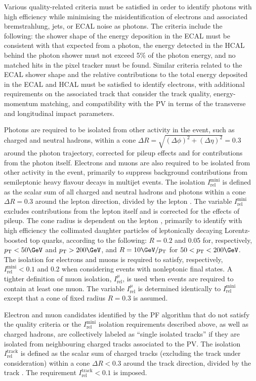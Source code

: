Various quality-related criteria must be satisfied in order to
identify photons with high efficiency while minimising the
misidentification of electrons and associated bremstrahlung, jets,
or ECAL noise as photons. The criteria include the following: the
shower shape of the energy deposition in the ECAL must be consistent
with that expected from a photon, the energy detected in the HCAL
behind the photon shower must not exceed 5\% of the photon energy, and
no matched hits in the pixel tracker must be found. Similar criteria
related to the ECAL shower shape and the relative contributions to the
total energy deposited in the ECAL and HCAL must be satisfied to
identify electrons, with additional requirements on the associated
track that consider the track quality, energy-momentum matching, and
compatibility with the PV in terms of the transverse and longitudinal
impact parameters.

Photons are required to be isolated from other activity in the event,
such as charged and neutral hadrons, within a cone $\Delta R =
\sqrt{(\Delta\phi)^2 + (\Delta\eta)^2} = 0.3$ around the photon
trajectory, corrected for pileup effects and for contributions from
the photon itself. Electrons and muons are also required to be
isolated from other activity in the event, primarily to suppress
background contributions from semileptonic heavy flavour decays in
multijet events. The isolation $I^\text{mini}_\text{rel}$ is defined
as the scalar \Pt sum of all charged and neutral hadrons and photons
within a cone $\Delta R = 0.3$ around the lepton direction, divided by
the lepton \Pt. The variable $I^\text{mini}_\text{rel}$ excludes
contributions from the lepton itself and is corrected for the effects
of pileup. The cone radius is dependent on the lepton \Pt, primarily
to identify with high efficiency the collimated daughter particles of
leptonically decaying Lorentz-boosted top quarks, according to the
following: $R = 0.2$ and 0.05 for, respectively, $\Pt < 50\GeV$ and
$\Pt > 200\GeV$, and $R = 10\GeV / \Pt$ for $50 < \Pt < 200\GeV$. The
isolation for electrons and muons is required to satisfy,
respectively, $I^\text{mini}_\text{rel} < 0.1$ and 0.2 when
considering events with nonleptonic final states. A tighter definition
of muon isolation, $I^{\mu}_\text{rel}$, is used when events are
required to contain at least one muon. The variable
$I^{\mu}_\text{rel}$ is determined identically to
$I^\text{mini}_\text{rel}$ except that a cone of fixed radius $R =
0.3$ is assumed.

Electron and muon candidates identified by the PF algorithm that do
not satisfy the quality criteria or the $I^\text{mini}_\text{rel}$
isolation requirements described above, as well as charged hadrons,
are collectively labeled as ``single isolated tracks'' if they are
isolated from neighbouring charged tracks associated to the PV. The
isolation $I^\text{track}_\text{rel}$ is defined as the scalar \Pt sum
of charged tracks (excluding the track under consideration) within a
cone $\Delta R < 0.3$ around the track direction, divided by the track
\Pt. The requirement $I^\text{track}_\text{rel} < 0.1$ is imposed.

